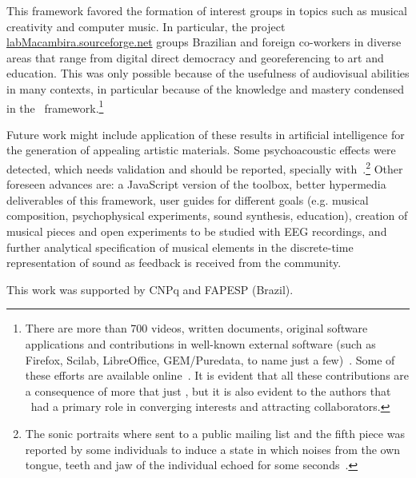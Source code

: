 This framework favored the formation of interest groups in topics such as musical creativity and computer music.
In particular, the project \url{labMacambira.sourceforge.net} groups Brazilian and foreign co-workers
in diverse areas that range from digital direct democracy and georeferencing to art and education.
This was only possible because of the usefulness of audiovisual abilities in many contexts, in particular because of the knowledge and mastery condensed in the \massa\ framework.\footnote{There are more than 700 videos, written documents,
 original software applications and contributions in well-known external software (such as Firefox, Scilab, LibreOffice, GEM/Puredata, to name just a few)~\cite{siteLM,wikiLM,vimeoLM}.
Some of these efforts are available online~\cite{dissertacao}.
It is evident that all these contributions are a consequence of more that just \massa, but it is also evident to the authors that \massa\ had a primary role in converging interests and attracting collaborators.}

Future work might include application of these results in artificial intelligence
for the generation of appealing artistic materials. Some psychoacoustic effects were detected,
which needs validation and should be reported, specially with~\cite{quadrosSonoros}.\footnote{The sonic portraits where sent to a public mailing list and the fifth piece was reported by some individuals to induce a state in which noises from the own tongue, teeth and jaw of the individual echoed for some seconds~\cite{quadrosMetarec}.} Other foreseen advances
are: a JavaScript version of the toolbox, better hypermedia deliverables of this framework, user guides
for different goals (e.g. musical composition, psychophysical experiments, sound synthesis, education), creation
of musical pieces and open experiments to be studied with EEG recordings, and further analytical specification of musical
elements in the discrete-time representation of sound as feedback is received from the community.

\begin{acks}
This work was supported by CNPq and FAPESP (Brazil).
\end{acks}


% 

